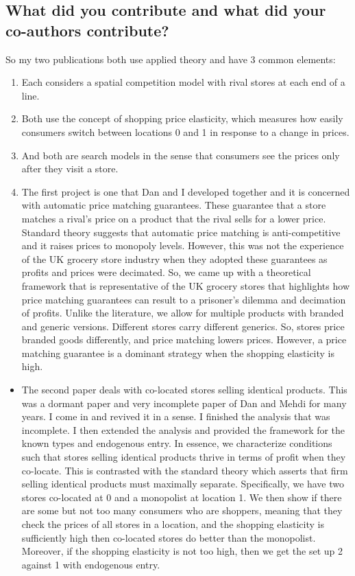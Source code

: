 \documentclass[12pt]{article}
\theoremstyle{plain}
\theoremstyle{plain}
\theoremstyle{plain}
\theoremstyle{plain}
\theoremstyle{plain}
\theoremstyle{plain}
\begin{document}
\subsection{What did you contribute and what did your co-authors contribute?}
\label{sec:orga088836}

So my two publications both use applied theory and have 3 common elements:
\begin{enumerate}
\item Each considers a spatial competition model with rival stores at each end of a line.
\item Both use the concept of shopping price elasticity, which measures how easily consumers switch between locations 0 and 1 in response to a change in prices.
\item And both are search models in the sense that consumers see the prices only after they visit a store.

\item The first project is one that Dan and I developed together and it is concerned with automatic price matching guarantees.
These guarantee that a store matches a rival's price on a product that the rival sells for a lower price.
Standard theory suggests that automatic price matching is anti-competitive and it raises prices to monopoly levels.
However, this was not the experience of the UK grocery store industry when they adopted these guarantees as profits and prices were decimated.
So, we came up with a theoretical framework that is representative of the UK grocery stores that highlights how price matching guarantees can result to a prisoner's dilemma and decimation of profits.
Unlike the literature, we allow for multiple products with branded and generic versions.
Different stores carry different generics.
So, stores price branded goods differently, and price matching lowers prices.
However, a price matching guarantee is a dominant strategy when the shopping elasticity is high.
\end{enumerate}


\begin{itemize}
\item The second paper deals with co-located stores selling identical products.
This was a dormant paper and very incomplete paper of Dan and Mehdi for many years.
I come in and revived it in a sense.
I finished the analysis that was incomplete.
I then extended the analysis and provided the framework for the known types and endogenous entry.
In essence, we characterize conditions such that stores selling identical products thrive in terms of profit when they co-locate.
This is contrasted with the standard theory which asserts that firm selling identical products must maximally separate.
Specifically, we have two stores co-located at 0 and a monopolist at location 1.
We then show if there are some but not too many consumers who are shoppers, meaning that they check the prices of all stores in a location,
and the shopping elasticity is sufficiently high then co-located stores do better than the monopolist.
Moreover, if the shopping elasticity is not too high, then we get the set up 2 against 1 with endogenous entry.
\end{itemize}
\end{document}
